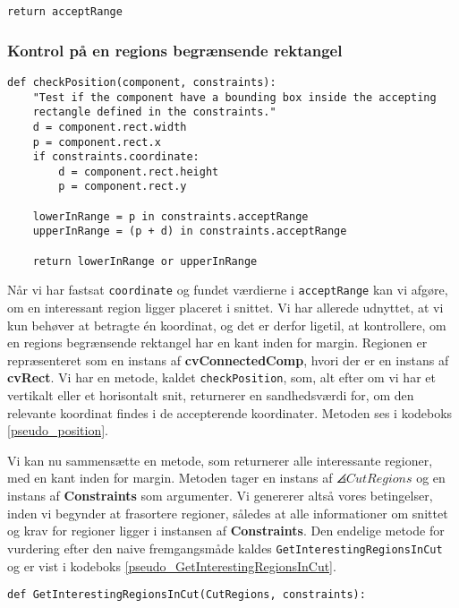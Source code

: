 {\begin{lstlisting}[caption={Metode, som genererer sættet af accepterende
    koordinater.},captionpos=b,label={pseudo_acceptRange},
    frame=tb, breaklines=false, float]
    return acceptRange
\end{lstlisting}

\subsubsection{Kontrol på en regions begrænsende rektangel}
\begin{lstlisting}[caption={Metode, som kontrollerer, hvorvidt en region
    har en kant af det begrænsende rektangel inden for margin.},
    captionpos=b, label={pseudo_position}, frame=tb, breaklines=false,
    float]
def checkPosition(component, constraints):
    "Test if the component have a bounding box inside the accepting
    rectangle defined in the constraints."
    d = component.rect.width
    p = component.rect.x
    if constraints.coordinate:
        d = component.rect.height
        p = component.rect.y

    lowerInRange = p in constraints.acceptRange
    upperInRange = (p + d) in constraints.acceptRange

    return lowerInRange or upperInRange
\end{lstlisting}
Når vi har fastsat \texttt{coordinate} og fundet værdierne i
\texttt{acceptRange} kan vi afgøre, om en interessant region ligger
placeret i snittet. Vi har allerede udnyttet, at vi kun behøver at
betragte én koordinat, og det er derfor ligetil, at kontrollere, om en
regions begrænsende rektangel har en kant inden for margin. Regionen er
repræsenteret som en instans af \textbf{cvConnectedComp}, hvori der er
en instans af \textbf{cvRect}. Vi har en metode, kaldet
\texttt{checkPosition}, som, alt efter om vi har et vertikalt eller et
horisontalt snit, returnerer en sandhedsværdi for, om den relevante
koordinat findes i de accepterende koordinater. Metoden ses i kodeboks
\ref{pseudo_position}.

Vi kan nu sammensætte en metode, som returnerer alle interessante
regioner, med en kant inden for margin. Metoden tager en instans af
$\angles{CutRegions}$ og en instans af \textbf{Constraints} som
argumenter. Vi genererer altså vores betingelser, inden vi begynder at
frasortere regioner, således at alle informationer om snittet og krav
for regioner ligger i instansen af \textbf{Constraints}. Den endelige
metode for vurdering efter den naive fremgangsmåde kaldes
\texttt{GetInterestingRegionsInCut} og er vist i kodeboks
\ref{pseudo_GetInterestingRegionsInCut}.

\begin{lstlisting}[caption={Pseudokode, som returnerer alle interessante
    regioner, der har en kant af deres begrænsende rektangel inden for
    margin.}, captionpos=b, label={pseudo_GetInterestingRegionsInCut},
    frame=tb, breaklines=false, float]
def GetInterestingRegionsInCut(CutRegions, constraints):


\end{lstlisting}}
